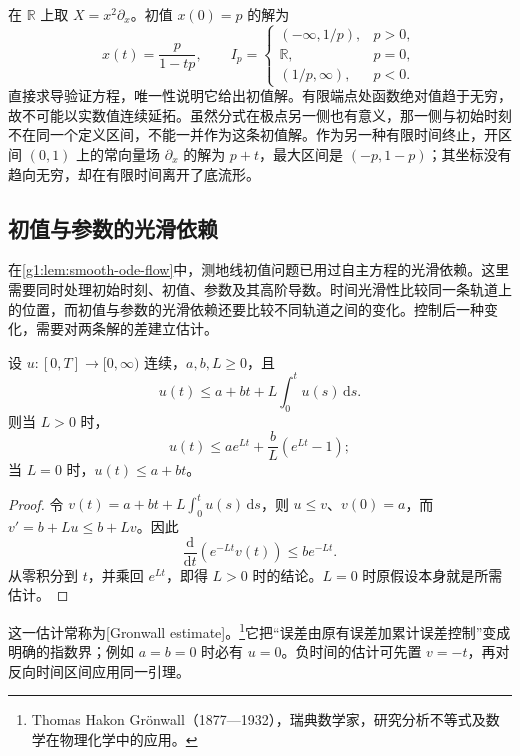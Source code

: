 \begin{example}
	\label{g1:exm:quadratic-maximal-interval}
	在 \(\mathbb R\) 上取 \(X=x^2\partial_x\)。初值 \(x(0)=p\) 的解为
	\[
		x(t)=\frac{p}{1-tp},\qquad
		I_p=\begin{cases}
			(-\infty,1/p),&p>0,\\
			\mathbb R,&p=0,\\
			(1/p,\infty),&p<0.
		\end{cases}
	\]
	直接求导验证方程，唯一性说明它给出初值解。有限端点处函数绝对值趋于无穷，故不可能以实数值连续延拓。虽然分式在极点另一侧也有意义，那一侧与初始时刻不在同一个定义区间，不能一并作为这条初值解。作为另一种有限时间终止，开区间 \((0,1)\) 上的常向量场 \(\partial_x\) 的解为 \(p+t\)，最大区间是 \((-p,1-p)\)；其坐标没有趋向无穷，却在有限时间离开了底流形。
\end{example}

\subsection{初值与参数的光滑依赖}
\label{g1:subsec:1301:02}

在\cref{g1:lem:smooth-ode-flow}中，测地线初值问题已用过自主方程的光滑依赖。这里需要同时处理初始时刻、初值、参数及其高阶导数。时间光滑性比较同一条轨道上的位置，而初值与参数的光滑依赖还要比较不同轨道之间的变化。控制后一种变化，需要对两条解的差建立估计。

\begin{lemma}
	\label{g1:lem:gronwall-estimate}
	设 \(u:[0,T]\to[0,\infty)\) 连续，\(a,b,L\geq0\)，且
	\[
		u(t)\leq a+bt+L\int_0^t u(s)\,\mathrm{d}s.
	\]
	则当 \(L>0\) 时，
	\[
		u(t)\leq a e^{Lt}+\frac bL(e^{Lt}-1);
	\]
	当 \(L=0\) 时，\(u(t)\leq a+bt\)。
\end{lemma}
\begin{proof}
	令 \(v(t)=a+bt+L\int_0^t u(s)\,\mathrm{d}s\)，则 \(u\leq v\)、\(v(0)=a\)，而 \(v'=b+Lu\leq b+Lv\)。因此
	\[
		\frac{\mathrm{d}}{\mathrm{d}t}(e^{-Lt}v(t))\leq b e^{-Lt}.
	\]
	从零积分到 \(t\)，并乘回 \(e^{Lt}\)，即得 \(L>0\) 时的结论。\(L=0\) 时原假设本身就是所需估计。
\end{proof}

这一估计常称为[Gronwall estimate]。\footnote{Thomas Hakon Grönwall（1877—1932），瑞典数学家，研究分析不等式及数学在物理化学中的应用。}它把“误差由原有误差加累计误差控制”变成明确的指数界；例如 \(a=b=0\) 时必有 \(u=0\)。负时间的估计可先置 \(v=-t\)，再对反向时间区间应用同一引理。

